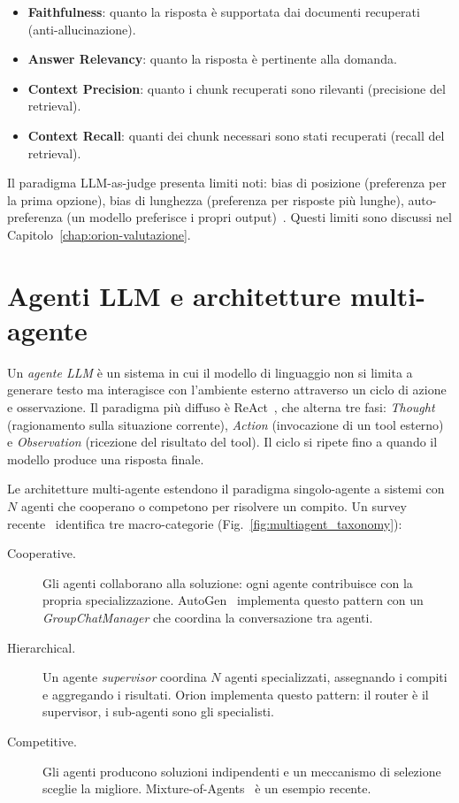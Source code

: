 \begin{itemize}
  \item \textbf{Faithfulness}: quanto la risposta è supportata dai documenti recuperati (anti-allucinazione).
  \item \textbf{Answer Relevancy}: quanto la risposta è pertinente alla domanda.
  \item \textbf{Context Precision}: quanto i chunk recuperati sono rilevanti (precisione del retrieval).
  \item \textbf{Context Recall}: quanti dei chunk necessari sono stati recuperati (recall del retrieval).
\end{itemize}

Il paradigma LLM-as-judge presenta limiti noti: 
bias di posizione (preferenza per la prima opzione), 
bias di lunghezza (preferenza per risposte più lunghe), 
auto-preferenza (un modello preferisce i propri output)~\cite{zheng2023llmjudge}. 
Questi limiti sono discussi nel Capitolo~\ref{chap:orion-valutazione}.

\section{Agenti LLM e architetture multi-agente}
\label{sec:bg-multiagent}

Un \emph{agente LLM} è un sistema in cui il modello di linguaggio non si limita a generare testo 
ma interagisce con l'ambiente esterno attraverso un ciclo di azione e osservazione. 
Il paradigma più diffuso è ReAct~\cite{yao2022react}, che alterna tre fasi: 
\emph{Thought} (ragionamento sulla situazione corrente), 
\emph{Action} (invocazione di un tool esterno) e 
\emph{Observation} (ricezione del risultato del tool). 
Il ciclo si ripete fino a quando il modello produce una risposta finale.

Le architetture multi-agente estendono il paradigma singolo-agente a sistemi con $N$ agenti 
che cooperano o competono per risolvere un compito. 
Un survey recente~\cite{guo2024multiagent} identifica tre macro-categorie (Fig.~\ref{fig:multiagent_taxonomy}):

\begin{description}
  \item[Cooperative.] Gli agenti collaborano alla soluzione: ogni agente contribuisce con la propria specializzazione. 
  AutoGen~\cite{wu2023autogen} implementa questo pattern con un \emph{GroupChatManager} che coordina la conversazione tra agenti.
  \item[Hierarchical.] Un agente \emph{supervisor} coordina $N$ agenti specializzati, assegnando i compiti e aggregando i risultati. 
  Orion implementa questo pattern: il router è il supervisor, i sub-agenti sono gli specialisti.
  \item[Competitive.] Gli agenti producono soluzioni indipendenti e un meccanismo di selezione sceglie la migliore. 
  Mixture-of-Agents~\cite{wang2024moa} è un esempio recente.
\end{description}

